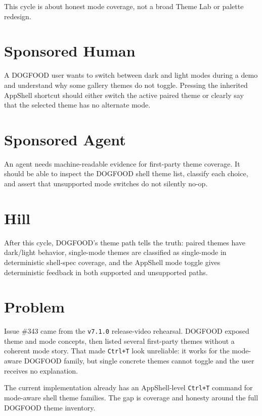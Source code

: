 This cycle is about honest mode coverage, not a broad Theme Lab or palette redesign.

\section{Sponsored Human}\label{record-183-sponsored-human}

A DOGFOOD user wants to switch between dark and light modes during a demo and understand why some gallery themes do not toggle. Pressing the inherited AppShell shortcut should either switch the active paired theme or clearly say that the selected theme has no alternate mode.

\section{Sponsored Agent}\label{record-183-sponsored-agent}

An agent needs machine-readable evidence for first-party theme coverage. It should be able to inspect the DOGFOOD shell theme list, classify each choice, and assert that unsupported mode switches do not silently no-op.

\section{Hill}\label{record-183-hill}

After this cycle, DOGFOOD's theme path tells the truth: paired themes have dark/light behavior, single-mode themes are classified as single-mode in deterministic shell-spec coverage, and the AppShell mode toggle gives deterministic feedback in both supported and unsupported paths.

\section{Problem}\label{record-183-problem}

Issue \#343 came from the \texttt{v\allowbreak{}7\allowbreak{}.\allowbreak{}1\allowbreak{}.\allowbreak{}0} release-video rehearsal. DOGFOOD exposed theme and mode concepts, then listed several first-party themes without a coherent mode story. That made \texttt{C\allowbreak{}t\allowbreak{}r\allowbreak{}l\allowbreak{}+\allowbreak{}T} look unreliable: it works for the mode-aware DOGFOOD family, but single concrete themes cannot toggle and the user receives no explanation.

The current implementation already has an AppShell-level \texttt{C\allowbreak{}t\allowbreak{}r\allowbreak{}l\allowbreak{}+\allowbreak{}T} command for mode-aware shell theme families. The gap is coverage and honesty around the full DOGFOOD theme inventory.

